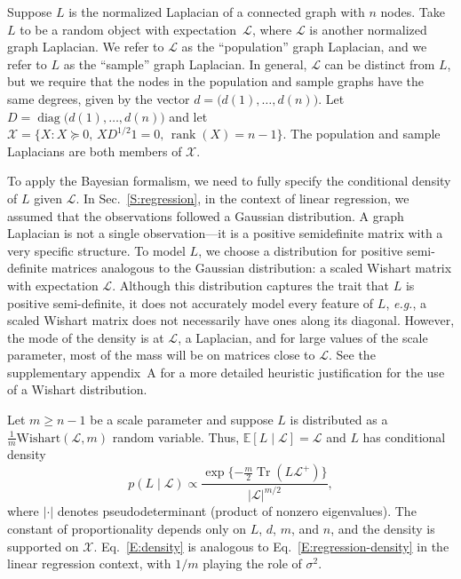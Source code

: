 \documentclass[12pt]{article}
\DeclareMathOperator*{\Tr}{Tr}
\DeclareMathOperator*{\diag}{diag}
\DeclareMathOperator*{\rank}{rank}
\newcommand{\E}{\mathbb{E}}
\theoremstyle{plain}
\begin{document}
Suppose $L$ is the normalized Laplacian of a connected graph with $n$
nodes.  Take $L$ to be a random object with expectation~$\mathcal{L}$,
where $\mathcal{L}$ is another normalized graph Laplacian.  We refer to $\mathcal{L}$ as the
``population'' graph Laplacian, and we refer to $L$ as the ``sample''
graph Laplacian.  
In general, $\mathcal{L}$ can be distinct from $L$,
but we require that the nodes in the population and sample graphs have
the same degrees, given by the vector $d = \big(d(1), \dotsc,
d(n)\big)$. Let $D = \diag\big(d(1), \dotsc, d(n)\big)$ and let
$\mathcal{X} = \{ X : X \succeq 0, \, X D^{1/2} 1 = 0, \, \rank(X) = n - 1 \}$.  The
population and sample Laplacians are both members of $\mathcal{X}$.


To apply the Bayesian formalism, we need to fully specify the conditional 
density of $L$ given $\mathcal{L}$.  
In Sec.~\ref{S:regression}, in the context of linear regression, we assumed 
that the observations followed a Gaussian distribution.  
A graph Laplacian is not a single observation---it is a positive
semidefinite matrix with a very specific structure.  To model $L$, we
choose a distribution for positive semi-definite matrices analogous to
the Gaussian distribution: a scaled Wishart matrix with expectation
$\mathcal{L}$.  
Although this distribution captures the trait that $L$ is positive 
semi-definite, it does not accurately model every feature of $L$, 
\emph{e.g.}, a scaled Wishart matrix does not necessarily have ones along 
its diagonal.  
However, the mode of the density is at $\mathcal{L}$, a Laplacian, and for 
large values of the scale parameter, most of the mass will be on matrices 
close to $\mathcal{L}$.
See the supplementary appendix~A for a more
detailed heuristic justification for the use of a Wishart distribution.

Let $m \geq n - 1$ be a scale parameter
and suppose $L$ is distributed as a
$\tfrac{1}{m} \mathrm{Wishart}(\mathcal{L}, m)$ random variable.
Thus, $\E[L \mid \mathcal{L}] = \mathcal{L}$ and $L$ has conditional density
\begin{equation}\label{E:density}
  p(L \mid \mathcal{L})
    \propto
      \frac{\exp\{ -\frac{m}{2} \Tr(L \mathcal{L}^+)\}}
           {|\mathcal{L}|^{m/2}},
\end{equation}
where $|\cdot|$ denotes pseudodeterminant (product of nonzero
eigenvalues).  The constant of proportionality depends only on $L$,
$d$, $m$, and $n$, and the density is supported on $\mathcal{X}$.
Eq.~\eqref{E:density} is analogous to Eq.~\eqref{E:regression-density}
in the linear regression context, with $1/m$ playing the role of
$\sigma^2$.
\end{document}
